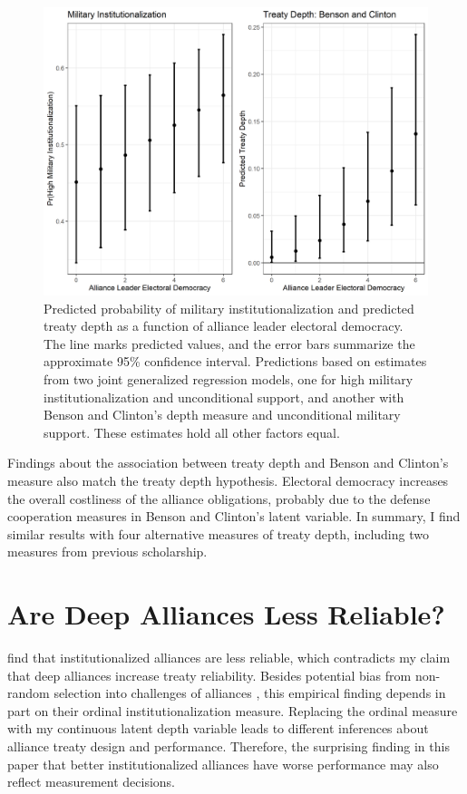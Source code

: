 \documentclass[12pt]{article}
\begin{document}
\begin{figure}
\includegraphics[width=.95\textwidth]{results-alt-measures.png}  
\caption{Predicted probability of military institutionalization and predicted treaty depth as a function of alliance leader electoral democracy. The line marks predicted values, and the error bars summarize the approximate 95\% confidence interval. Predictions based on estimates from two joint generalized regression models, one for high military institutionalization and unconditional support, and another with Benson and Clinton's depth measure and unconditional military support. These estimates hold all other factors equal.}
\label{fig:results-alt-measures}
\end{figure}


Findings about the association between treaty depth and Benson and Clinton's measure also match the treaty depth hypothesis. 
Electoral democracy increases the overall costliness of the alliance obligations, probably due to the defense cooperation measures in Benson and Clinton's latent variable. 
In summary, I find similar results with four alternative measures of treaty depth, including two measures from previous scholarship. 




\section{Are Deep Alliances Less Reliable?} 


\citet{LeedsAnac2005} find that institutionalized alliances are less reliable, which contradicts my claim that deep alliances increase treaty reliability. 
Besides potential bias from non-random selection into challenges of alliances \citep{Smith1995}, this empirical finding depends in part on their ordinal institutionalization measure. 
Replacing the ordinal measure with my continuous latent depth variable leads to different inferences about alliance treaty design and performance. 
Therefore, the surprising finding in this paper that better institutionalized alliances have worse performance may also reflect measurement decisions. 
\end{document}
